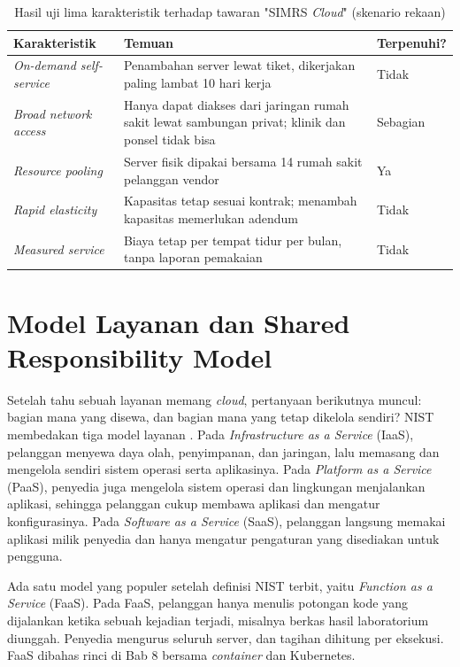 \begin{table}[!htb]
  \centering
  \caption{Hasil uji lima karakteristik terhadap tawaran "SIMRS \textit{Cloud}" (skenario
           rekaan)}
  \label{tab:ch02-uji-vendor}
  \small
  \begin{tabularx}{\textwidth}{>{\raggedright\arraybackslash}p{2.7cm}
      >{\raggedright\arraybackslash}X >{\raggedright\arraybackslash}p{1.9cm}}
    \hline
    \textbf{Karakteristik} & \textbf{Temuan} & \textbf{Terpenuhi?} \\
    \hline
    \textit{On-demand self-service} & Penambahan server lewat tiket, dikerjakan paling
      lambat 10 hari kerja & Tidak \\
    \hline
    \textit{Broad network access} & Hanya dapat diakses dari jaringan rumah sakit lewat
      sambungan privat; klinik dan ponsel tidak bisa & Sebagian \\
    \hline
    \textit{Resource pooling} & Server fisik dipakai bersama 14 rumah sakit pelanggan vendor
      & Ya \\
    \hline
    \textit{Rapid elasticity} & Kapasitas tetap sesuai kontrak; menambah kapasitas
      memerlukan adendum & Tidak \\
    \hline
    \textit{Measured service} & Biaya tetap per tempat tidur per bulan, tanpa laporan
      pemakaian & Tidak \\
    \hline
  \end{tabularx}
\end{table}

\section{Model Layanan dan Shared Responsibility Model}

Setelah tahu sebuah layanan memang \textit{cloud}, pertanyaan berikutnya muncul: bagian mana
yang disewa, dan bagian mana yang tetap dikelola sendiri? NIST membedakan tiga model layanan
\cite{nist800-145}. Pada \textit{Infrastructure as a Service} (IaaS), pelanggan menyewa
daya olah, penyimpanan, dan jaringan, lalu memasang dan mengelola sendiri sistem operasi
serta aplikasinya. Pada \textit{Platform as a Service} (PaaS), penyedia juga mengelola
sistem operasi dan lingkungan menjalankan aplikasi, sehingga pelanggan cukup membawa
aplikasi dan mengatur konfigurasinya. Pada \textit{Software as a Service} (SaaS), pelanggan
langsung memakai aplikasi milik penyedia dan hanya mengatur pengaturan yang disediakan untuk
pengguna.

Ada satu model yang populer setelah definisi NIST terbit, yaitu \textit{Function as a
Service} (FaaS). Pada FaaS, pelanggan hanya menulis potongan kode yang dijalankan ketika
sebuah kejadian terjadi, misalnya berkas hasil laboratorium diunggah. Penyedia mengurus
seluruh server, dan tagihan dihitung per eksekusi. FaaS dibahas rinci di Bab 8 bersama
\textit{container} dan Kubernetes.

